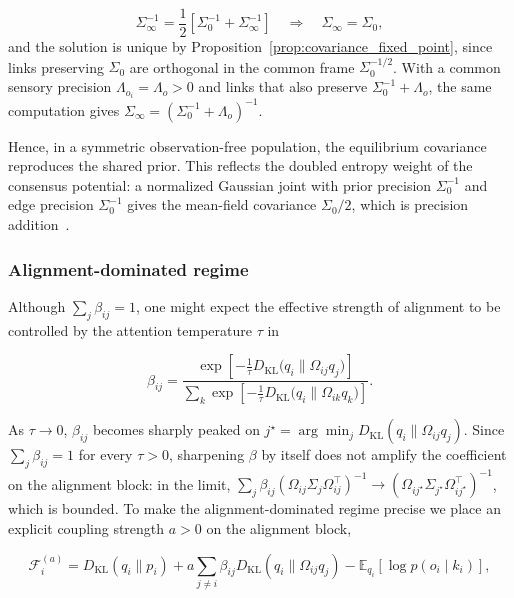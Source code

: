 \documentclass[11pt]{article}
\begin{document}
\begin{equation}
\Sigma_\infty^{-1}
=\frac{1}{2}
\left[
\Sigma_0^{-1}
+ \Sigma_\infty^{-1}
\right]
\quad\Longrightarrow\quad
\Sigma_\infty = \Sigma_0,
\end{equation}
and the solution is unique by Proposition~\ref{prop:covariance_fixed_point}, since links preserving $\Sigma_0$ are orthogonal in the common frame $\Sigma_0^{-1/2}$. With a common sensory precision $\Lambda_{o_i} = \Lambda_o > 0$ and links that also preserve $\Sigma_0^{-1} + \Lambda_o$, the same computation gives $\Sigma_\infty = (\Sigma_0^{-1} + \Lambda_o)^{-1}$.

Hence, in a symmetric observation-free population, the equilibrium covariance reproduces the shared prior. This reflects the doubled entropy weight of the consensus potential: a normalized Gaussian joint with prior precision $\Sigma_0^{-1}$ and edge precision $\Sigma_0^{-1}$ gives the mean-field covariance $\Sigma_0/2$, which is precision addition~\cite[Ch.~G4, block optimum]{DennisGaugeVFESuppG2026}.

\subsubsection{Alignment-dominated regime}

Although $\sum_j \beta_{ij} = 1$, one might expect the effective strength of alignment to be controlled by the attention temperature $\tau$ in

\begin{equation}
\beta_{ij}
=\frac{
\exp\left[
-\frac{1}{\tau}
D_{\mathrm{KL}}\big(q_i \| \Omega_{ij} q_j\big)
\right]
}{\sum_k
\exp\left[
-\frac{1}{\tau}
D_{\mathrm{KL}}\big(q_i \| \Omega_{ik} q_k\big)
\right]}.
\end{equation}

As $\tau \to 0$, $\beta_{ij}$ becomes sharply peaked on $j^\star = \arg\min_j D_{\mathrm{KL}}(q_i \| \Omega_{ij}q_j)$. Since $\sum_j \beta_{ij} = 1$ for every $\tau > 0$, sharpening $\beta$ by itself does not amplify the coefficient on the alignment block: in the limit, $\sum_j \beta_{ij}(\Omega_{ij}\Sigma_j\Omega_{ij}^\top)^{-1} \to (\Omega_{ij^\star}\Sigma_{j^\star}\Omega_{ij^\star}^\top)^{-1}$, which is bounded. To make the alignment-dominated regime precise we place an explicit coupling strength $a > 0$ on the alignment block,

\begin{equation}
\mathcal{F}_i^{(a)}
=D_{\mathrm{KL}}(q_i \| p_i)
+ a \sum_{j \neq i} \beta_{ij}
D_{\mathrm{KL}}(q_i \| \Omega_{ij} q_j)
- \mathbb{E}_{q_i}[\log p(o_i \mid k_i)],
\end{equation}
\end{document}
